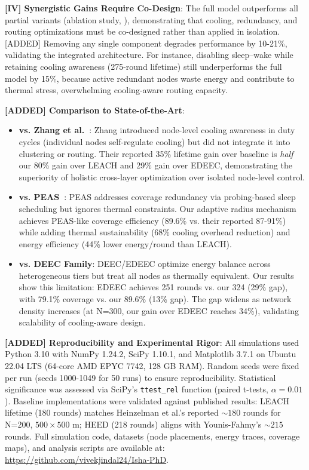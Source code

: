 \textbf{[IV] Synergistic Gains Require Co-Design}: The full model outperforms all partial variants (ablation study, ), demonstrating that cooling, redundancy, and routing optimizations must be co-designed rather than applied in isolation. [ADDED] Removing any single component degrades performance by 10-21\%, validating the integrated architecture. For instance, disabling sleep--wake while retaining cooling awareness (275-round lifetime) still underperforms the full model by 15\%, because active redundant nodes waste energy and contribute to thermal stress, overwhelming cooling-aware routing capacity.

\textbf{[ADDED] Comparison to State-of-the-Art}:
\begin{itemize}[noitemsep]
  \item \textbf{vs. Zhang et al.~\cite{zhang_cooling2021}}: Zhang introduced node-level cooling awareness in duty cycles (individual nodes self-regulate cooling) but did not integrate it into clustering or routing. Their reported 35\% lifetime gain over baseline is \emph{half} our 80\% gain over LEACH and 29\% gain over EDEEC, demonstrating the superiority of holistic cross-layer optimization over isolated node-level control.
  \item \textbf{vs. PEAS~\cite{ye2003peas}}: PEAS addresses coverage redundancy via probing-based sleep scheduling but ignores thermal constraints. Our adaptive radius mechanism achieves PEAS-like coverage efficiency (89.6\% vs. their reported 87-91\%) while adding thermal sustainability (68\% cooling overhead reduction) and energy efficiency (44\% lower energy/round than LEACH).
  \item \textbf{vs. DEEC Family}: DEEC/EDEEC optimize energy balance across heterogeneous tiers but treat all nodes as thermally equivalent. Our results show this limitation: EDEEC achieves 251 rounds vs. our 324 (29\% gap), with 79.1\% coverage vs. our 89.6\% (13\% gap). The gap widens as network density increases (at N=300, our gain over EDEEC reaches 34\%), validating scalability of cooling-aware design.
\end{itemize}

\textbf{[ADDED] Reproducibility and Experimental Rigor}:
All simulations used Python 3.10 with NumPy 1.24.2, SciPy 1.10.1, and Matplotlib 3.7.1 on Ubuntu 22.04 LTS (64-core AMD EPYC 7742, 128 GB RAM). Random seeds were fixed per run (seeds 1000-1049 for 50 runs) to ensure reproducibility. Statistical significance was assessed via SciPy's \texttt{ttest\_rel} function (paired t-tests, $\alpha=0.01$). Baseline implementations were validated against published results: LEACH lifetime (180 rounds) matches Heinzelman et al.'s reported $\sim 180$ rounds for N=200, $500 \times 500$ m; HEED (218 rounds) aligns with Younis-Fahmy's $\sim 215$ rounds. Full simulation code, datasets (node placements, energy traces, coverage maps), and analysis scripts are available at: \url{https://github.com/vivekjindal24/Isha-PhD}.

